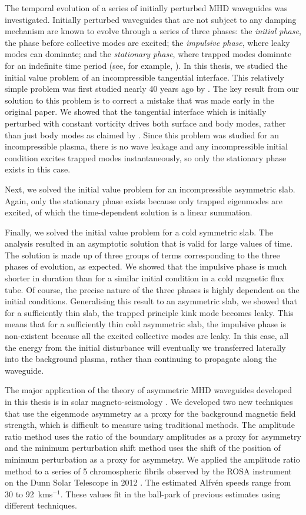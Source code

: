 The temporal evolution of a series of initially perturbed MHD waveguides was investigated. Initially perturbed waveguides that are not subject to any damping mechanism are known to evolve through a series of three phases: the \textit{initial phase}, the phase before collective modes are excited; the \textit{impulsive phase}, where leaky modes can dominate; and the \textit{stationary phase}, where trapped modes dominate for an indefinite time period (see, for example, \cite{rud_etal06b}). In this thesis, we studied the initial value problem of an incompressible tangential interface. This relatively simple problem was first studied nearly 40 years ago by \cite{rae_etal81}. The key result from our solution to this problem is to correct a mistake that was made early in the original paper. We showed that the tangential interface which is initially perturbed with constant vorticity drives both surface and body modes, rather than just body modes as claimed by \cite{rae_etal81}. Since this problem was studied for an incompressible plasma, there is no wave leakage and any incompressible initial condition excites trapped modes instantaneously, so only the stationary phase exists in this case.

Next, we solved the initial value problem for an incompressible asymmetric slab. Again, only the stationary phase exists because only trapped eigenmodes are excited, of which the time-dependent solution is a linear summation.

Finally, we solved the initial value problem for a cold symmetric slab. The analysis resulted in an asymptotic solution that is valid for large values of time. The solution is made up of three groups of terms corresponding to the three phases of evolution, as expected. We showed that the impulsive phase is much shorter in duration than for a similar initial condition in a cold magnetic flux tube. Of course, the precise nature of the three phases is highly dependent on the initial conditions. Generalising this result to an asymmetric slab, we showed that for a sufficiently thin slab, the trapped principle kink mode becomes leaky. This means that for a sufficiently thin cold asymmetric slab, the impulsive phase is non-existent because all the excited collective modes are leaky. In this case, all the energy from the initial disturbance will eventually we transferred laterally into the background plasma, rather than continuing to propagate along the waveguide.

The major application of the theory of asymmetric MHD waveguides developed in this thesis is in solar magneto-seismology \citep{all_etal18a}. We developed two new techniques that use the eigenmode asymmetry as a proxy for the background magnetic field strength, which is difficult to measure using traditional methods. The amplitude ratio method uses the ratio of the boundary amplitudes as a proxy for asymmetry and the minimum perturbation shift method uses the shift of the position of minimum perturbation as a proxy for asymmetry. We applied the amplitude ratio method to a series of 5 chromospheric fibrils observed by the ROSA instrument on the Dunn Solar Telescope in 2012 \citep{all_etal19}. The estimated Alfv\'{e}n speeds range from 30 to 92~kms$^{-1}$. These values fit in the ball-park of previous estimates using different techniques.
